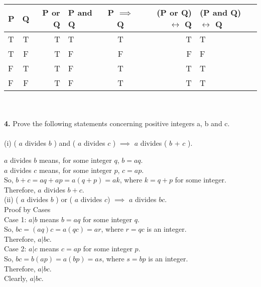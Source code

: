 \documentclass[paper=letter, fontsize=11pt]{scrartcl} %
\begin{document}
\begin{tabular} {| l | c | r | l | c | r | l |}
	\hline
	P & Q & P or Q & P and Q & P $\implies$ Q & (P or Q) $\leftrightarrow$ Q & (P and Q) $\leftrightarrow$ Q\\ \hline
	T & T & T & T & T & T & T\\ \hline
	T & F & T & F & F & F & F\\ \hline
	F & T & T & F & T & T & T\\ \hline
	F & F & T & F & T & T & T\\ \hline
\end{tabular}
\\\\

\textbf{4.} Prove the following statements concerning positive integers a, b and c.
\\\\
(i) ( $a$ divides $b$ ) and ( $a$ divides $c$ ) $\implies$ $a$ divides ( $b$ + $c$ ).

$a$ divides $b$ means, for some integer $q$, $b=aq$.\\
$a$ divides $c$ means, for some integer $p$, $c=ap$.\\
So, $b + c = aq + ap = a(q + p) = ak$, where $k = q + p$ for some integer.\\
Therefore, $a$ divides $b + c$.\\

(ii) ( $a$ divides $b$ ) or ( $a$ divides $c$) $\implies$ $a$ divides $bc$.\\

Proof by Cases \\
Case 1: $a | b$ means $b = aq$ for some integer $q$.\\
So, $bc = (aq)c = a(qc) = ar$, where $r = qc$ is an integer.\\
Therefore, $a | bc$.\\

Case 2: $a | c$ means $c = ap$ for some integer $p$.\\
So, $bc = b(ap) = a(bp) = as$, where $s = bp$ is an integer.\\
Therefore, $a | bc$.\\

Clearly, $a | bc$.\\\\
\end{document}
